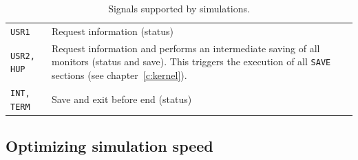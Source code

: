 \begin{table}
  \begin{center}
    {\let\my=\\
    \begin{tabular}{|p{}|p{}|}
      \hline
      \texttt{USR1} & Request information (status)  \\
      \texttt{USR2, HUP} & Request information and performs an intermediate
      saving of all monitors (status and save). This triggers the execution of
      all \texttt{SAVE} sections (see chapter~\ref{c:kernel}).  \\
      \texttt{INT, TERM} & Save and exit before end (status)  \\
      \hline
    \end{tabular}
    \caption{Signals supported by \MCS simulations.}
    \label{t:signals}
    }
  \end{center}
\end{table}

\subsection{Optimizing simulation speed}
\label{s:optim}

